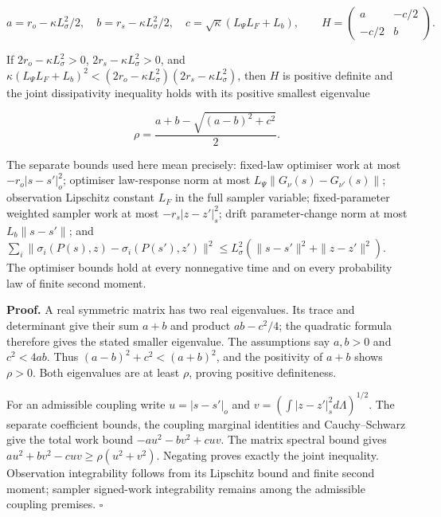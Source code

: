 \documentclass[11pt,a4paper]{report}
\begin{document}
\[a=r_o-\kappa L_\sigma^2/2,\quad b=r_s-\kappa L_\sigma^2/2,\quad c=\sqrt\kappa(L_\Psi L_F+L_b),\qquad H=\begin{pmatrix}a&-c/2\\-c/2&b\end{pmatrix}.\]

If \(2r_o-\kappa L_\sigma^2>0\), \(2r_s-\kappa L_\sigma^2>0\), and \(\kappa(L_\Psi L_F+L_b)^2<(2r_o-\kappa L_\sigma^2)(2r_s-\kappa L_\sigma^2)\), then \(H\) is positive definite and the joint dissipativity inequality holds with its positive smallest eigenvalue

\[\rho=\frac{a+b-\sqrt{(a-b)^2+c^2}}2.\]

The separate bounds used here mean precisely: fixed-law optimiser work at most \(-r_o|s-s'|_o^2\); optimiser law-response norm at most \(L_\Psi\|G_\nu(s)-G_{\nu'}(s)\|\); observation Lipschitz constant \(L_F\) in the full sampler variable; fixed-parameter weighted sampler work at most \(-r_s|z-z'|_s^2\); drift parameter-change norm at most \(L_b\|s-s'\|\); and \(\sum_i\|\sigma_i(P(s),z)-\sigma_i(P(s'),z')\|^2\le L_\sigma^2(\|s-s'\|^2+\|z-z'\|^2)\). The optimiser bounds hold at every nonnegative time and on every probability law of finite second moment.



\textbf{Proof.} A real symmetric matrix has two real eigenvalues. Its trace and determinant give their sum \(a+b\) and product \(ab-c^2/4\); the quadratic formula therefore gives the stated smaller eigenvalue. The assumptions say \(a,b>0\) and \(c^2<4ab\). Thus \((a-b)^2+c^2<(a+b)^2\), and the positivity of \(a+b\) shows \(\rho>0\). Both eigenvalues are at least \(\rho\), proving positive definiteness.



For an admissible coupling write \(u=|s-s'|_o\) and \(v=(\int|z-z'|_s^2d\Lambda)^{1/2}\). The separate coefficient bounds, the coupling marginal identities and Cauchy–Schwarz give the total work bound \(-au^2-bv^2+cuv\). The matrix spectral bound gives \(au^2+bv^2-cuv\ge\rho(u^2+v^2)\). Negating proves exactly the joint inequality. Observation integrability follows from its Lipschitz bound and finite second moment; sampler signed-work integrability remains among the admissible coupling premises. \(\square\)
\end{document}
